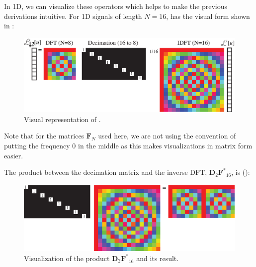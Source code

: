 In 1D, we can visualize these operators which helps to make the previous derivations intuitive. For 1D signals of length $N=16$, \eqn{\ref{eq:matrixformsubsampling}} has the visual form shown in \fig{\ref{fig:aliasing_in_matrix_form}}:
\begin{figure}[h!]
	\centerline{
		\includegraphics[width=.9\linewidth]{figures/upsamplig_downsampling/aliasing_in_matrix_form.eps}
	}
	\caption{Visual representation of \eqn{\ref{eq:matrixformsubsampling}}.}
	\label{fig:aliasing_in_matrix_form}
\end{figure}

Note that for the matrices $\mathbf{F}_{N}$ used here, we are not using the convention of putting the frequency 0 in the middle as this makes visualizations in matrix form easier.

The product between the decimation matrix and the inverse DFT, $\mathbf{D}_2 \mathbf{F^*}_{16}$, is (\fig{\ref{fig:decimationFT_inmatrixform}}):
\begin{figure}[h!]
	\centerline{
		\includegraphics[width=.9\linewidth]{figures/upsamplig_downsampling/decimationFT_inmatrixform.eps}
	}
	\caption{Visualization of the product $\mathbf{D}_2 \mathbf{F^*}_{16}$ and its result.}
	\label{fig:decimationFT_inmatrixform}
\end{figure}

